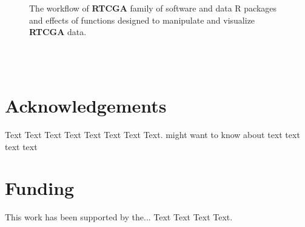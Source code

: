 \documentclass{bioinfo}
\begin{document}
\begin{figure}
\begin{center}
\hspace{5pt}
	\end{center}
\caption{The workflow of \textbf{RTCGA} family of software and data R packages and effects of functions designed to manipulate and visualize \textbf{RTCGA} data. }
\label{fig:RTCGA_workflow_ver3}
\end{figure}

\ \\ \ \\

\section*{Acknowledgements}

Text Text Text Text Text Text  Text Text.  \citealp{Boffelli03} might want to know about  text
text text text\vspace*{-12pt}

\section*{Funding}

This work has been supported by the... Text Text  Text Text.\vspace*{-12pt}


%
%
%
%
%
%
%

\end{document}
